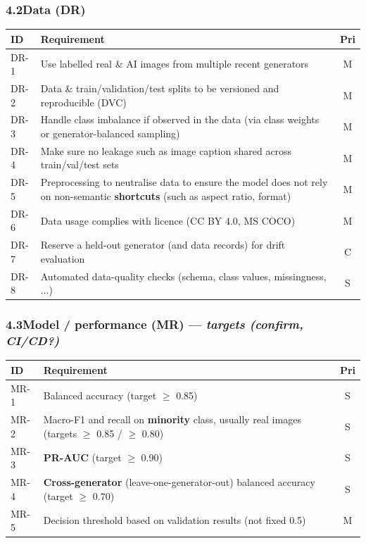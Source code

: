 \documentclass[11pt]{article}
\begin{document}
\subsubsection*{4.2\quad Data (DR)}
\begin{tabularx}{\textwidth}{@{}l Y c@{}}
\toprule
\textbf{ID} & \textbf{Requirement} & \textbf{Pri} \\
\midrule
DR-1 & Use labelled real \& AI images from multiple recent generators & M \\
DR-2 & Data \& train/validation/test splits to be versioned and reproducible (DVC) & M \\
DR-3 & Handle class imbalance if observed in the data (via class weights or generator-balanced sampling) & M \\
DR-4 & Make sure no leakage such as image caption shared across train/val/test sets & M \\
DR-5 & Preprocessing to neutralise data to ensure the model does not rely on non-semantic \textbf{shortcuts} (such as aspect ratio, format) & M \\
DR-6 & Data usage complies with licence (CC BY 4.0, MS COCO) & M \\
DR-7 & Reserve a held-out generator (and data records) for drift evaluation & C \\
DR-8 & Automated data-quality checks (schema, class values, missingness, ...) & S \\
\bottomrule
\end{tabularx}

\subsubsection*{4.3\quad Model / performance (MR) --- \textit{targets (confirm, CI/CD?)}}
\begin{tabularx}{\textwidth}{@{}l Y c@{}}
\toprule
\textbf{ID} & \textbf{Requirement} & \textbf{Pri} \\
\midrule
MR-1 & Balanced accuracy (target $\geq$ 0.85) & S \\
MR-2 & Macro-F1 and recall on \textbf{minority} class, usually real images (targets $\geq$ 0.85 / $\geq$ 0.80) & S \\
MR-3 & \textbf{PR-AUC} (target $\geq$ 0.90) & S \\
MR-4 & \textbf{Cross-generator} (leave-one-generator-out) balanced accuracy (target $\geq$ 0.70) & S \\
MR-5 & Decision threshold based on validation results (not fixed 0.5) & M \\
\bottomrule
\end{tabularx}
\end{document}
